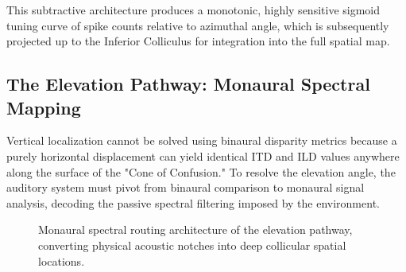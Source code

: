 This subtractive architecture produces a monotonic, highly sensitive sigmoid tuning curve of spike counts relative to azimuthal angle, which is subsequently projected up to the Inferior Colliculus for integration into the full spatial map.

\subsection{The Elevation Pathway: Monaural Spectral Mapping}
\label{sec:elevation_pathway}
Vertical localization cannot be solved using binaural disparity metrics because a purely horizontal displacement can yield identical ITD and ILD values anywhere along the surface of the "Cone of Confusion." To resolve the elevation angle, the auditory system must pivot from binaural comparison to monaural signal analysis, decoding the passive spectral filtering imposed by the environment.

\begin{figure}[htbp]
\centering
{}
\caption{Monaural spectral routing architecture of the elevation pathway, converting physical acoustic notches into deep collicular spatial locations.}
\label{fig:tikz_elevation_pathway}
\end{figure}

